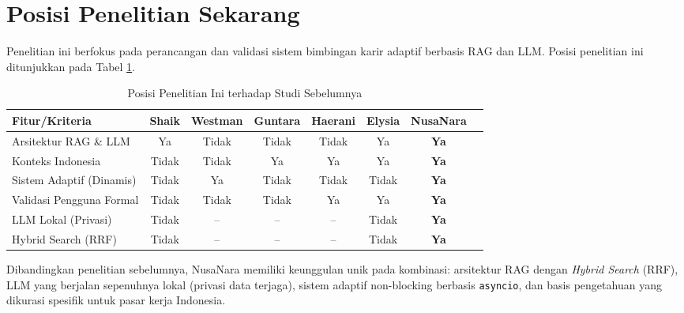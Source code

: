 \section{Posisi Penelitian Sekarang}
Penelitian ini berfokus pada perancangan dan validasi sistem bimbingan karir adaptif
berbasis RAG dan LLM. Posisi penelitian ini ditunjukkan pada Tabel \ref{tab:position}.

\begin{table}[H]
\centering
\caption{Posisi Penelitian Ini terhadap Studi Sebelumnya}
\label{tab:position}
\begin{tabularx}{\textwidth}{Xccccccc}
\toprule
\textbf{Fitur/Kriteria} & \textbf{Shaik} & \textbf{Westman} & \textbf{Guntara} & \textbf{Haerani} & \textbf{Elysia} & \textbf{NusaNara} \\
\midrule
Arsitektur RAG \& LLM & Ya & Tidak & Tidak & Tidak & Ya & \textbf{Ya} \\
Konteks Indonesia & Tidak & Tidak & Ya & Ya & Ya & \textbf{Ya} \\
Sistem Adaptif (Dinamis) & Tidak & Ya & Tidak & Tidak & Tidak & \textbf{Ya} \\
Validasi Pengguna Formal & Tidak & Tidak & Tidak & Ya & Ya & \textbf{Ya} \\
LLM Lokal (Privasi) & Tidak & -- & -- & -- & Tidak & \textbf{Ya} \\
Hybrid Search (RRF) & Tidak & -- & -- & -- & Tidak & \textbf{Ya} \\
\bottomrule
\end{tabularx}
\end{table}

Dibandingkan penelitian sebelumnya, NusaNara memiliki keunggulan unik pada kombinasi:
arsitektur RAG dengan \textit{Hybrid Search} (RRF), LLM yang berjalan sepenuhnya lokal
(privasi data terjaga), sistem adaptif non-blocking berbasis \texttt{asyncio}, dan
basis pengetahuan yang dikurasi spesifik untuk pasar kerja Indonesia.
